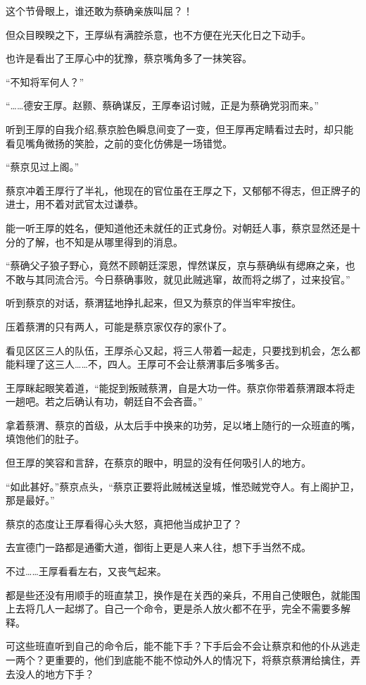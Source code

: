 这个节骨眼上，谁还敢为蔡确亲族叫屈？！

但众目睽睽之下，王厚纵有满腔杀意，也不方便在光天化日之下动手。

也许是看出了王厚心中的犹豫，蔡京嘴角多了一抹笑容。

“不知将军何人？”

“……德安王厚。赵颢、蔡确谋反，王厚奉诏讨贼，正是为蔡确党羽而来。”

听到王厚的自我介绍,蔡京脸色瞬息间变了一变，但王厚再定睛看过去时，却只能看见嘴角微扬的笑脸，之前的变化仿佛是一场错觉。

“蔡京见过上阁。”

蔡京冲着王厚行了半礼，他现在的官位虽在王厚之下，又郁郁不得志，但正牌子的进士，用不着对武官太过谦恭。

能一听王厚的姓名，便知道他还未就任的正式身份。对朝廷人事，蔡京显然还是十分的了解，也不知是从哪里得到的消息。

“蔡确父子狼子野心，竟然不顾朝廷深恩，悍然谋反，京与蔡确纵有缌麻之亲，也不敢与其同流合污。今日蔡确事败，就见此贼逃窜，故而将之绑了，过来投官。”

听到蔡京的对话，蔡渭猛地挣扎起来，但又为蔡京的伴当牢牢按住。

压着蔡渭的只有两人，可能是蔡京家仅存的家仆了。

看见区区三人的队伍，王厚杀心又起，将三人带着一起走，只要找到机会，怎么都能料理了这三人……不，四人。王厚可不会让蔡渭事后多嘴多舌。

王厚眯起眼笑着道，“能捉到叛贼蔡渭，自是大功一件。蔡京你带着蔡渭跟本将走一趟吧。若之后确认有功，朝廷自不会吝啬。”

拿着蔡渭、蔡京的首级，从太后手中换来的功劳，足以堵上随行的一众班直的嘴，填饱他们的肚子。

但王厚的笑容和言辞，在蔡京的眼中，明显的没有任何吸引人的地方。

“如此甚好。”蔡京点头，“蔡京正要将此贼械送皇城，惟恐贼党夺人。有上阁护卫，那是最好。”

蔡京的态度让王厚看得心头大怒，真把他当成护卫了？

去宣德门一路都是通衢大道，御街上更是人来人往，想下手当然不成。

不过……王厚看看左右，又丧气起来。

都是些还没有用顺手的班直禁卫，换作是在关西的亲兵，不用自己使眼色，就能围上去将几人一起绑了。自己一个命令，更是杀人放火都不在乎，完全不需要多解释。

可这些班直听到自己的命令后，能不能下手？下手后会不会让蔡京和他的仆从逃走一两个？更重要的，他们到底能不能不惊动外人的情况下，将蔡京蔡渭给擒住，弄去没人的地方下手？

